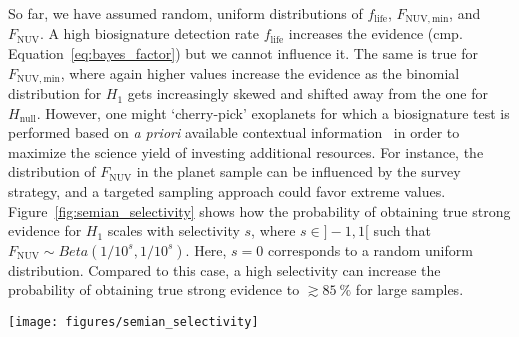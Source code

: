 \documentclass[twocolumn,twocolappendix,linenumbers]{aastex631}
\begin{document}
So far, we have assumed random, uniform distributions of $f_\mathrm{life}$, $F_\mathrm{NUV, min}$, and $F_\mathrm{NUV}$. %
A high biosignature detection rate $f_\mathrm{life}$ increases the evidence (cmp. Equation~\ref{eq:bayes_factor}) but we cannot influence it.
The same is true for $F_\mathrm{NUV, min}$, where again higher values increase the evidence as the binomial distribution for $H_\mathrm{1}$ gets increasingly skewed and shifted away from the one for $H_\mathrm{null}$.
However, one might `cherry-pick' exoplanets for which a biosignature test is performed based on \textit{a priori} available contextual information~\citep{catling2018exoplanet} in order to maximize the science yield of investing additional resources.
For instance, the distribution of $F_\mathrm{NUV}$ in the planet sample can be influenced by the survey strategy, and a targeted sampling approach could favor extreme values.%
Figure~\ref{fig:semian_selectivity} shows how the probability of obtaining true strong evidence for $H_\mathrm{1}$ scales with selectivity $s$, where $s\in]-1,1[$ such that $F_\mathrm{NUV} \sim Beta(1/10^s,1/10^s)$.
Here, $s=0$ corresponds to a random uniform distribution.
Compared to this case, a high selectivity can increase the probability of obtaining true strong evidence to $\gtrsim \SI{85}{\percent}$ for large samples.

\begin{figure*}
    \begin{centering}
        \texttt{[image: figures/semian\_selectivity]}
        \caption{Scaling of the probability of obtaining true strong evidence with sample selectivity. Left: Sampling distribution for different selectivity parameters $s$. Right: Resulting \mbox{P(true strong evidence)} (random, uniform $f_\mathrm{life}$, $F_\mathrm{NUV, min}$). Sampling more extreme values of $F_\mathrm{NUV}$ is more likely to yield strong evidence.}
        \label{fig:semian_selectivity}
    \end{centering}
\end{figure*}
\end{document}
